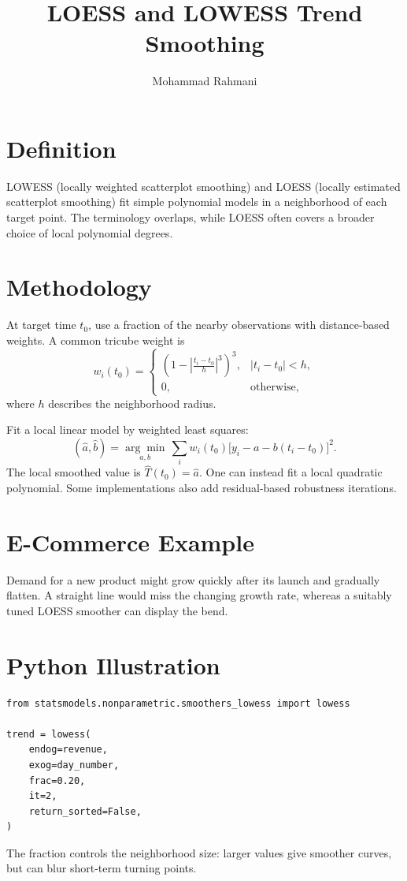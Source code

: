 \documentclass[a4paper]{article}
\title{LOESS and LOWESS Trend Smoothing}
\date{}
\author{Mohammad Rahmani}
\begin{document}
\maketitle

\section{Definition}
LOWESS (locally weighted scatterplot smoothing) and LOESS (locally estimated scatterplot smoothing) fit simple polynomial models in a neighborhood of each target point. The terminology overlaps, while LOESS often covers a broader choice of local polynomial degrees.

\section{Methodology}
At target time $t_0$, use a fraction of the nearby observations with distance-based weights. A common tricube weight is
\[
 w_i(t_0)=
 \begin{cases}
 \left(1-\left|\frac{t_i-t_0}{h}\right|^3\right)^3,
       &|t_i-t_0|<h,\\
 0,&\text{otherwise},
 \end{cases}
\]
where $h$ describes the neighborhood radius.

Fit a local linear model by weighted least squares:
\[
 (\widehat a,\widehat b)=\underset{a,b}{\arg\min}\,
 \sum_i w_i(t_0)\bigl[y_i-a-b(t_i-t_0)\bigr]^2.
\]
The local smoothed value is $\widehat T(t_0)=\widehat a$. One can instead fit a local quadratic polynomial. Some implementations also add residual-based robustness iterations.

\section{E-Commerce Example}
Demand for a new product might grow quickly after its launch and gradually flatten. A straight line would miss the changing growth rate, whereas a suitably tuned LOESS smoother can display the bend.

\section{Python Illustration}
\begin{verbatim}
from statsmodels.nonparametric.smoothers_lowess import lowess

trend = lowess(
    endog=revenue,
    exog=day_number,
    frac=0.20,
    it=2,
    return_sorted=False,
)
\end{verbatim}
The fraction controls the neighborhood size: larger values give smoother curves, but can blur short-term turning points.
\end{document}
